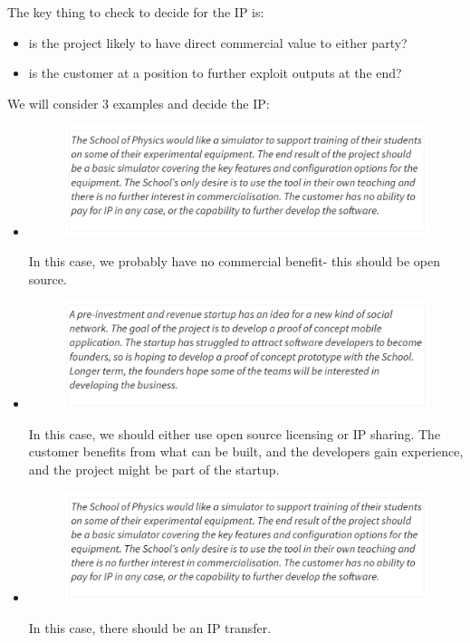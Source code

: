 \documentclass[a4paper, openany]{memoir}
\begin{document}
The key thing to check to decide for the IP is:
\begin{itemize}
    \item is the project likely to have direct commercial value to either party?
    \item is the customer at a position to further exploit outputs at the end?
\end{itemize}

We will consider 3 examples and decide the IP:
\begin{itemize}
    \item \begin{figure}[H]
        \centering
        \includegraphics[scale=0.45]{src/IP Example 1.PNG}
    \end{figure}
    In this case, we probably have no commercial benefit- this should be open source.
    
    \item \begin{figure}[H]
        \centering
        \includegraphics[scale=0.45]{src/IP Example 2.PNG}
    \end{figure}
    In this case, we should either use open source licensing or IP sharing. The customer benefits from what can be built, and the developers gain experience, and the project might be part of the startup.
    
    \item \begin{figure}[H]
        \centering
        \includegraphics[scale=0.45]{src/IP Example 1.PNG}
    \end{figure}
    In this case, there should be an IP transfer.
\end{itemize}
\end{document}
